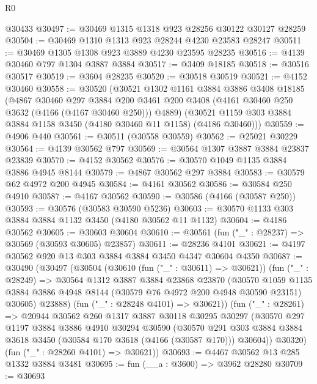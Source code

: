 \begin{lexlean}{R0}
\begin{coremodule}
    @30433
@30497 := @30469 @1315 @1318 @923 @28256 @30122 @30127 @28259
@30504 := @30469 @1310 @1313 @923 @28244 @4230 @23583 @28247
@30511 := @30469 @1305 @1308 @923 @3889 @4230 @23595 @28235
@30516 := @4139 @30460 @797 @1304 @3887 @3884
@30517 := @3409 @18185
@30518 := @30516 @30517
@30519 := @3604 @28235
@30520 := @30518 @30519
@30521 := @4152 @30460
@30558 := @30520
    (@30521
      @1302
      @1161
      @3884
      @3886
      @3408
      @18185
      (@4867
        @30460
        @297
        @3884
        @200
        @3461
        @200
        @3408
        (@4161 @30460 @250 @3632 (@4166 (@4167 @30460 @250)))
        @4889)
      (@30521 @1159 @303 @3884 @3884 @1158 @3450 (@4180 @30460 @11 @1158) (@4186 @30460)))
@30559 := @4906 @440
@30561 := @30511 (@30558 @30559)
@30562 := @25021 @30229
@30564 := @4139 @30562 @797
@30569 := @30564 @1307 @3887 @3884 @23837 @23839
@30570 := @4152 @30562
@30576 := @30570 @1049 @1135 @3884 @3886 @4945 @8144
@30579 := @4867 @30562 @297 @3884
@30583 := @30579 @62 @4972 @200 @4945
@30584 := @4161 @30562
@30586 := @30584 @250 @4910
@30587 := @4167 @30562
@30590 := @30586 (@4166 (@30587 @250))
@30593 := @30576 (@30583 @30590 @5236)
@30603 := @30570 @1133 @303 @3884 @3884 @1132 @3450 (@4180 @30562 @11 @1132)
@30604 := @4186 @30562
@30605 := @30603 @30604
@30610 := @30561 (fun ("_" : @28237) => @30569 (@30593 @30605) @23857)
@30611 := @28236 @4101
@30621 := @4197 @30562 @920 @13 @303 @3884 @3884 @3450 @4347 @30604 @4350
@30687 := @30490
    (@30497
      (@30504
        (@30610 (fun ("_" : @30611) => @30621))
        (fun ("_" : @28249) =>
        @30564
          @1312
          @3887
          @3884
          @23868
          @23870
          (@30570
            @1059
            @1135
            @3884
            @3886
            @4948
            @8144
            (@30579 @76 @4972 @200 @4948 @30590 @23151)
            @30605)
          @23888)
        (fun ("_" : @28248 @4101) => @30621))
      (fun ("_" : @28261) =>
      @20944
        @30562
        @260
        @1317
        @3887
        @30118
        @30295
        @30297
        (@30570
          @297
          @1197
          @3884
          @3886
          @4910
          @30294
          @30590
          (@30570
            @291
            @303
            @3884
            @3884
            @3618
            @3450
            (@30584 @170 @3618 (@4166 (@30587 @170)))
            @30604))
        @30320)
      (fun ("_" : @28260 @4101) => @30621))
@30693 := @4467 @30562 @13 @285 @1332 @3884 @3481
@30695 := fun (__a : @3600) => @3962 @28280
@30709 := @30693

\end{coremodule}
\end{lexlean}
